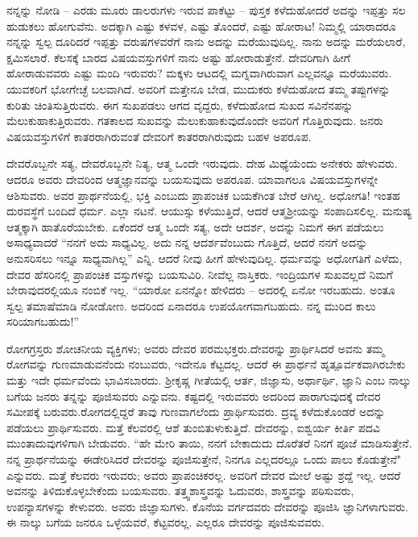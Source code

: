 ನನ್ನನ್ನು ನೋಡಿ – ಎರಡು ಮೂರು ಡಾಲರುಗಳು ಇರುವ ಪಾಕೆಟ್ಟು – ಪುಸ್ತಕ ಕಳೆದುಹೋದರೆ ಅದನ್ನು ಇಪ್ಪತ್ತು ಸಲ ಹುಡುಕಲು ಹೋಗುವೆನು. ಅದಕ್ಕಾಗಿ ಎಷ್ಟು ಕಳವಳ, ಎಷ್ಟು ತೊಂದರೆ, ಎಷ್ಟು ಹೋರಾಟ! ನಿಮ್ಮಲ್ಲಿ ಯಾರಾದರೂ ನನ್ನನ್ನು ಸ್ವಲ್ಪ ದೂರಿದರೆ ಇಪ್ಪತ್ತು ವರುಷಗಳವರೆಗೆ ನಾನು ಅದನ್ನು ಮರೆಯುವುದಿಲ್ಲ. ನಾನು ಅದನ್ನು ಮರೆಯಲಾರೆ, ಕ್ಷಮಿಸಲಾರೆ. ಕೆಲಸಕ್ಕೆ ಬಾರದ ವಿಷಯವಸ್ತುಗಳಿಗೆ ನಾನು ಅಷ್ಟು ಹೋರಾಡುತ್ತೇನೆ. ದೇವರಿಗಾಗಿ ಹೀಗೆ ಹೋರಾಡುವವರು ಎಷ್ಟು ಮಂದಿ ಇರುವರು? ಮಕ್ಕಳು ಆಟದಲ್ಲಿ ಮಗ್ನವಾಗಿರುವಾಗ ಎಲ್ಲವನ್ನೂ ಮರೆಯುವರು. ಯುವಕರಿಗೆ ಭೋಗೇಚ್ಛೆ ಬಲವಾಗಿದೆ. ಅವರಿಗೆ ಮತ್ತೇನೂ ಬೇಡ, ಮುದುಕರು ಕಳೆದುಹೋದ ತಮ್ಮ ತಪ್ಪುಗಳನ್ನು ಕುರಿತು ಚಿಂತಿಸುತ್ತಿರುವರು. ಈಗ ಸುಖಪಡಲು ಆಗದ ವೃದ್ದರು, ಕಳೆದುಹೋದ ಸುಖದ ಸವಿನೆನಪನ್ನು ಮೆಲುಕುಹಾಕುತ್ತಿರುವರು. ಗತಕಾಲದ ಸುಖವನ್ನು ಮೆಲುಕುಹಾಕುವುದೊಂದೇ ಅವರಿಗೆ ಗೊತ್ತಿರುವುದು. ಜನರು ವಿಷಯವಸ್ತುಗಳಿಗೆ ಕಾತರರಾಗಿರುವಂತೆ ದೇವರಿಗೆ ಕಾತರರಾಗಿರುವುದು ಬಹಳ ಅಪರೂಪ.

ದೇವರೊಬ್ಬನೇ ಸತ್ಯ, ದೇವರೊಬ್ಬನೇ ನಿತ್ಯ, ಆತ್ಮ ಒಂದೇ ಇರುವುದು. ದೇಹ ಮಿಥ್ಯೆಯೆಂದು ಅನೇಕರು ಹೇಳುವರು. ಆದರೂ ಅವರು ದೇವರಿಂದ ಆತ್ಮಜ್ಞಾನವನ್ನು ಬಯಸುವುದು ಅಪರೂಪ. ಯಾವಾಗಲೂ ವಿಷಯವಸ್ತುಗಳನ್ನೇ ಆಶಿಸುವರು. ಅವರ ಪ್ರಾರ್ಥನೆಯಲ್ಲಿ, ಭಕ್ತಿ ಎಂಬುದು ಪ್ರಾಪಂಚಿಕ ಬಯಕೆಗಿಂತ ಬೇರೆ ಆಗಿಲ್ಲ. ಅಧೋಗತಿ! ಇಂತಹ ದುರವಸ್ಥೆಗೆ ಬಂದಿದೆ ಧರ್ಮ. ಎಲ್ಲಾ ನಟನೆ. ಆಯುಸ್ಸು ಕಳೆಯುತ್ತಿದೆ, ಆದರೆ ಆತ್ಮಶ‍್ರೀಯನ್ನು ಸಂಪಾದಿಸಲಿಲ್ಲ. ಮನುಷ್ಯ ಆತ್ಮಕ್ಕಾಗಿ ಹಾತೊರೆಯಬೇಕು. ಏಕೆಂದರೆ ಆತ್ಮ ಒಂದೇ ಸತ್ಯ, ಅದೇ ಆದರ್ಶ, ಅದನ್ನು ನಿಮಗೆ ಈಗ ಪಡೆಯಲು ಅಸಾಧ್ಯವಾದರೆ “ನನಗೆ ಅದು ಸಾಧ್ಯವಿಲ್ಲ. ಅದು ನನ್ನ ಆದರ್ಶವೆಂಬುದು ಗೊತ್ತಿದೆ, ಆದರೆ ನನಗೆ ಅದನ್ನು ಅನುಸರಿಸಲು ಇನ್ನೂ ಸಾಧ್ಯವಾಗಿಲ್ಲ” ಎನ್ನಿ. ಆದರೆ ನೀವು ಹೀಗೆ ಹೇಳುವುದಿಲ್ಲ. ಧರ್ಮವನ್ನು ಅಧೋಗತಿಗೆ ಎಳೆದು, ದೇವರ ಹೆಸರಿನಲ್ಲಿ ಪ್ರಾಪಂಚಿಕ ವಸ್ತುಗಳನ್ನು ಬಯಸುವಿರಿ. ನೀವೆಲ್ಲ ನಾಸ್ತಿಕರು. ಇಂದ್ರಿಯಗಳ ಸುಖವಲ್ಲದೆ ನಿಮಗೆ ಬೇರಾವುದರಲ್ಲಿಯೂ ನಂಬಿಕೆ ಇಲ್ಲ. “ಯಾರೋ ಏನನ್ನೋ ಹೇಳಿದರು – ಅದರಲ್ಲಿ ಏನೋ ಇರಬಹುದು. ಅಂತೂ ಸ್ವಲ್ಪ ತಮಾಷೆಮಾಡಿ ನೋಡೋಣ. ಅದರಿಂದ ಏನಾದರೂ ಉಪಯೋಗವಾಗಬಹುದು. ನನ್ನ ಮುರಿದ ಕಾಲು ಸರಿಯಾಗಬಹುದು!”

ರೋಗಗ್ರಸ್ತರು ಶೋಚನೀಯ ವ್ಯಕ್ತಿಗಳು; ಅವರು ದೇವರ ಪರಮಭಕ್ತರು.\break ದೇವರನ್ನು ಪ್ರಾರ್ಥಿಸಿದರೆ ಅವನು ತಮ್ಮ ರೋಗವನ್ನು ಗುಣಮಾಡುವನೆಂದು ನಂಬುವರು, ಇದೇನೂ ಕೆಟ್ಟದಲ್ಲ. ಆದರೆ ಈ ಪ್ರಾರ್ಥನೆ ಹೃತ್ಪೂರ್ವಕವಾಗಿರಬೇಕು ಮತ್ತು ಇದೇ ಧರ್ಮವೆಂದು ಭಾವಿಸಬಾರದು. ಶ‍್ರೀಕೃಷ್ಣ ಗೀತೆಯಲ್ಲಿ ಆರ್ತ, ಜಿಜ್ಞಾಸು, ಅರ್ಥಾರ್ಥಿ, ಜ್ಞಾನಿ ಎಂಬ ನಾಲ್ಕು ಬಗೆಯ ಜನರು ತನ್ನನ್ನು ಪೂಜಿಸುವರು ಎನ್ನುವನು. ಕಷ್ಟದಲ್ಲಿ ಇರುವವರು ಅದರಿಂದ ಪಾರಾಗುವುದಕ್ಕೆ ದೇವರ ಸಮೀಪಕ್ಕೆ ಬರುವರು.\break ರೋಗದಲ್ಲಿದ್ದರೆ ತಾವು ಗುಣವಾಗಲೆಂದು ಪ್ರಾರ್ಥಿಸುವರು. ದ್ರವ್ಯ ಕಳೆದುಕೊಂಡರೆ ಅದನ್ನು ಪಡೆಯಲು ಪ್ರಾರ್ಥಿಸುವರು. ಮತ್ತೆ ಕೆಲವರಲ್ಲಿ ಆಶೆ ತುಂಬಿತುಳುಕುತ್ತಿದೆ. ದೇವರನ್ನು, ಐಶ್ವರ್ಯ ಕೀರ್ತಿ ಪದವಿ ಮುಂತಾದುವುಗಳಿಗಾಗಿ ಬೇಡುವರು. “ಹೇ ಮೇರಿ ತಾಯಿ, ನನಗೆ ಬೇಕಾದುದು ದೊರೆತರೆ ನಿನಗೆ ಪೂಜೆ ಮಾಡಿಸುತ್ತೇನೆ. ನನ್ನ ಪ್ರಾರ್ಥನೆಯನ್ನು ಈಡೇರಿಸಿದರೆ ದೇವರನ್ನು ಪೂಜಿಸುತ್ತೇನೆ, ನಿನಗೂ ಎಲ್ಲದರಲ್ಲೂ ಒಂದು ಪಾಲು ಕೊಡುತ್ತೇನೆ" ಎನ್ನುವರು. ಮತ್ತೆ ಕೆಲವರು ಇರುವರು; ಅವರು ಪ್ರಾಪಂಚಿಕರಲ್ಲ. ಅವರಿಗೆ ದೇವರ ಮೇಲೆ ಅಷ್ಟು ಶ್ರದ್ದೆ ಇಲ್ಲ. ಆದರೆ ಅವನನ್ನು ತಿಳಿದುಕೊಳ್ಳಬೇಕೆಂದು ಬಯಸುವರು. ತತ್ತ್ವಶಾಸ್ತ್ರವನ್ನು ಓದುವರು, ಶಾಸ್ತ್ರವನ್ನು ಪಠಿಸುವರು, ಉಪನ್ಯಾಸಗಳನ್ನು ಕೇಳುವರು. ಅವರು ಜಿಜ್ಞಾಸುಗಳು. ಕೊನೆಯ ವರ್ಗದವರು ದೇವರನ್ನು ಪೂಜಿಸಿ ಜ್ಞಾನಿಗಳಾಗುವರು. ಈ ನಾಲ್ಕು ಬಗೆಯ ಜನರೂ ಒಳ್ಳೆಯವರೆ, ಕೆಟ್ಟವರಲ್ಲ. ಎಲ್ಲರೂ ದೇವರನ್ನು ಪೂಜಿಸುವವರು.

